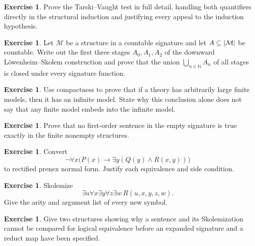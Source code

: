 \documentclass[11pt,oneside,openany]{book}
\theoremstyle{definition}
\newtheorem{exercise}[definition]{Exercise}
\theoremstyle{plain}
\theoremstyle{remark}
\DeclarePairedDelimiter{\abs}{\lvert}{\rvert}
\newcommand{\N}{\mathbb{N}}
\newcommand{\Meta}{\mathcal{M}}
\begin{document}
\begin{exercise}
\label{ex:fol-cardinality-normalforms-01}
Prove the Tarski--Vaught test in full detail, handling both quantifiers
directly in the structural induction and justifying every appeal to the
induction hypothesis.
\end{exercise}

\begin{exercise}
\label{ex:fol-cardinality-normalforms-02}
Let \(\Meta\) be a structure in a countable signature and let
\(A\subseteq\abs{\Meta}\) be countable.  Write out the first three stages
\(A_0,A_1,A_2\) of the downward L\"owenheim--Skolem construction and prove
that the union \(\bigcup_{n\in\N}A_n\) of all stages is closed under every
signature function.
\end{exercise}

\begin{exercise}
\label{ex:fol-cardinality-normalforms-03}
Use compactness to prove that if a theory has arbitrarily large finite models,
then it has an infinite model.  State why this conclusion alone does not say
that any finite model embeds into the infinite model.
\end{exercise}

\begin{exercise}
\label{ex:fol-cardinality-normalforms-04}
Prove that no first-order sentence in the empty signature is true exactly in
the finite nonempty structures.
\end{exercise}

\begin{exercise}
\label{ex:fol-cardinality-normalforms-05}
Convert
\[
 \neg\forall x\bigl(P(x)\to\exists y(Q(y)\land R(x,y))\bigr)
\]
to rectified prenex normal form.  Justify each equivalence and side condition.
\end{exercise}

\begin{exercise}
\label{ex:fol-cardinality-normalforms-06}
Skolemize
\[
 \exists u\forall x\exists y\forall z\exists w\,
 R(u,x,y,z,w).
\]
Give the arity and argument list of every new symbol.
\end{exercise}

\begin{exercise}
\label{ex:fol-cardinality-normalforms-07}
Give two structures showing why a sentence and its Skolemization cannot be
compared for logical equivalence before an expanded signature and a reduct map
have been specified.
\end{exercise}
\end{document}
